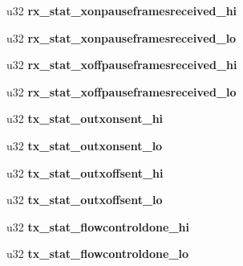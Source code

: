 \begin{DoxyCompactItemize}
\item 
\hypertarget{structmac__stx_ad92b5091a079c9110785b5ee2a126f2c}{
u32 {\bfseries rx\_\-stat\_\-xonpauseframesreceived\_\-hi}}
\label{structmac__stx_ad92b5091a079c9110785b5ee2a126f2c}

\item 
\hypertarget{structmac__stx_a73bd579226049a1e6efca849848357a8}{
u32 {\bfseries rx\_\-stat\_\-xonpauseframesreceived\_\-lo}}
\label{structmac__stx_a73bd579226049a1e6efca849848357a8}

\item 
\hypertarget{structmac__stx_ad03d30434787a163de0d653646ea2fc8}{
u32 {\bfseries rx\_\-stat\_\-xoffpauseframesreceived\_\-hi}}
\label{structmac__stx_ad03d30434787a163de0d653646ea2fc8}

\item 
\hypertarget{structmac__stx_ae0c90f7b850dfbd9c0fe4c61b4f78e59}{
u32 {\bfseries rx\_\-stat\_\-xoffpauseframesreceived\_\-lo}}
\label{structmac__stx_ae0c90f7b850dfbd9c0fe4c61b4f78e59}

\item 
\hypertarget{structmac__stx_ac030e6412af09f143d5c72c3989a98e8}{
u32 {\bfseries tx\_\-stat\_\-outxonsent\_\-hi}}
\label{structmac__stx_ac030e6412af09f143d5c72c3989a98e8}

\item 
\hypertarget{structmac__stx_a1cda3555e6c078cec0e94b661574d4fb}{
u32 {\bfseries tx\_\-stat\_\-outxonsent\_\-lo}}
\label{structmac__stx_a1cda3555e6c078cec0e94b661574d4fb}

\item 
\hypertarget{structmac__stx_a5e43db403ed52213b1a33164b667edd1}{
u32 {\bfseries tx\_\-stat\_\-outxoffsent\_\-hi}}
\label{structmac__stx_a5e43db403ed52213b1a33164b667edd1}

\item 
\hypertarget{structmac__stx_a02722af64dcd00e1fb11c81bda8f59db}{
u32 {\bfseries tx\_\-stat\_\-outxoffsent\_\-lo}}
\label{structmac__stx_a02722af64dcd00e1fb11c81bda8f59db}

\item 
\hypertarget{structmac__stx_ab62593bd905af6ecb2fb5b4ce2622900}{
u32 {\bfseries tx\_\-stat\_\-flowcontroldone\_\-hi}}
\label{structmac__stx_ab62593bd905af6ecb2fb5b4ce2622900}

\item 
\hypertarget{structmac__stx_a74e97920ca4023be44babb5686d98e38}{
u32 {\bfseries tx\_\-stat\_\-flowcontroldone\_\-lo}}
\label{structmac__stx_a74e97920ca4023be44babb5686d98e38}


\end{DoxyCompactItemize}
